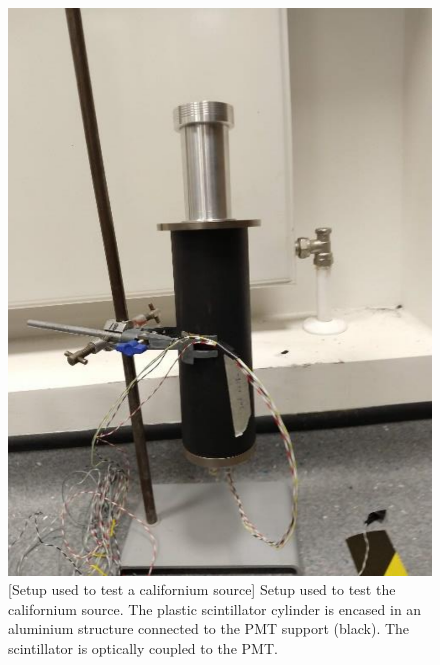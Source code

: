 \begin{figure}
	\centering
	\includegraphics[width=0.3\linewidth]{pics/device.png}
	\hspace{1em}
	[Setup used to test a californium source]%
	{Setup used to test the californium source.
		The plastic scintillator cylinder is encased in an aluminium structure %
		connected to the PMT support (black).
		The scintillator is optically coupled to the PMT.}
	\label{fig:setup}
\end{figure}

